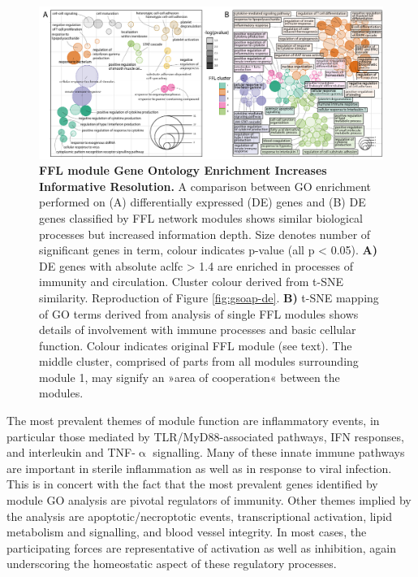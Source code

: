 \begin{figure}
\includegraphics[width=\textwidth]{figures/gsoap-ffl}
\caption[FFL module Gene Ontology Enrichment.]{\textbf{FFL module Gene Ontology Enrichment Increases Informative Resolution.} A comparison between GO enrichment performed on (A) differentially expressed (DE) genes and (B) DE genes classified by FFL network modules shows similar biological processes but increased information depth. Size denotes number of significant genes in term, colour indicates p-value (all p < 0.05). \textbf{A)} DE genes with absolute ac{lfc} > 1.4 are enriched in processes of immunity and circulation. Cluster colour derived from t-SNE similarity. Reproduction of Figure \ref{fig:gsoap-de}. \textbf{B)} t-SNE mapping of GO terms derived from analysis of single FFL modules shows details of involvement with immune processes and basic cellular function. Colour indicates original FFL module (see text). The middle cluster, comprised of parts from all modules surrounding module 1, may signify an »area of cooperation« between the modules.
\label{fig:gsoap-ffl}}
\end{figure}

The most prevalent themes of module function are inflammatory events, in particular those mediated by TLR/MyD88-associated pathways, IFN responses, and interleukin and TNF-$\upalpha$ signalling. Many of these innate immune pathways are important in sterile inflammation as well as in response to viral infection. This is in concert with the fact that the most prevalent genes identified by module GO analysis are pivotal regulators of immunity. Other themes implied by the analysis are apoptotic/necroptotic events, transcriptional activation, lipid metabolism and signalling, and blood vessel integrity. In most cases, the participating forces are representative of activation as well as inhibition, again underscoring the homeostatic aspect of these regulatory processes.

